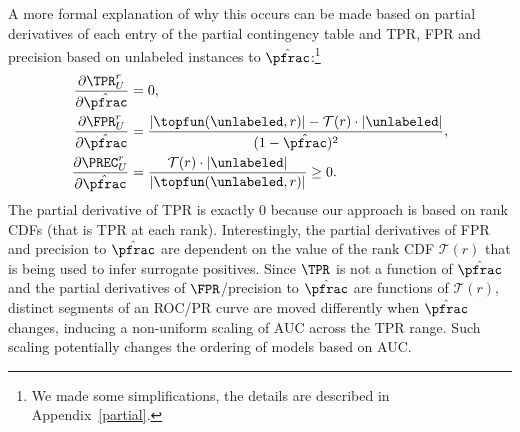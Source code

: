 A more formal explanation of why this occurs can be made based on partial derivatives of each entry of the partial contingency table and TPR, FPR and precision based on unlabeled instances to $\hat{\pfrac}$:\footnote{We made some simplifications, the details are described in Appendix~\ref*{partial}.}
\begin{align}
\frac{\partial \TPR_U^r}{\partial \hat{\pfrac}} &= 0,\\
\frac{\partial \FPR_U^r}{\partial \hat{\pfrac}} &= \frac{|\topfun(\unlabeled, r)| - \mathcal{T}(r) \cdot |\unlabeled|}{(1-\hat{\pfrac})^2}, \label{eq:partials} \\
\frac{\partial \PREC_U^r}{\partial \hat{\pfrac}} &= \frac{\mathcal{T}(r)\cdot|\unlabeled|}{|\topfun(\unlabeled,r)|} \geq 0.
\end{align}
The partial derivative of TPR is exactly 0 because our approach is based on rank CDFs (that is TPR at each rank). Interestingly, the partial derivatives of FPR and precision to $\hat{\pfrac}$ are dependent on the value of the rank CDF $\mathcal{T}(r)$ that is being used to infer surrogate positives. Since $\TPR$ is not a function of $\hat{\pfrac}$ and the partial derivatives of $\FPR$/precision to $\hat{\pfrac}$ are functions of $\mathcal{T}(r)$, distinct segments of an ROC/PR curve are moved differently when $\hat{\pfrac}$ changes, inducing a non-uniform scaling of AUC across the TPR range. Such scaling potentially changes the ordering of models based on AUC. 


